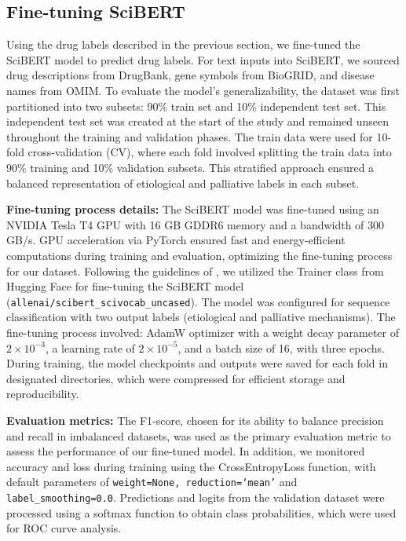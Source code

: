\documentclass[journal,twoside,web]{ieeecolor}
\begin{document}
\subsection{Fine-tuning SciBERT}
Using the drug labels described in the previous section, we fine-tuned the SciBERT model to predict drug labels.
For text inputs into SciBERT, we sourced drug descriptions from DrugBank, gene symbols from BioGRID, and disease names from OMIM. To evaluate the model’s generalizability, the dataset was first partitioned into two subsets:
90\% train set and 10\% independent test set.
This independent test set was created at the start of the study and remained unseen throughout the training and validation phases. 
The train data were used for 10-fold cross-validation (CV), where each fold involved splitting the train data into 90\% training and 10\% validation subsets. 
This stratified approach ensured a balanced representation of etiological and palliative labels in each subset.

\textbf{Fine-tuning process details:}
The SciBERT model was fine-tuned using an NVIDIA Tesla T4 GPU with 16 GB GDDR6 memory and a bandwidth of 300 GB/s. 
GPU acceleration via PyTorch ensured fast and energy-efficient computations during training and evaluation, optimizing the fine-tuning process for our dataset.
Following the guidelines of \cite{devlin-etal-2019-bert}, we utilized the Trainer class from Hugging Face \cite{wolf2019huggingface} for fine-tuning the SciBERT model (\texttt{allenai/scibert\_scivocab\_uncased}).
The model was configured for sequence classification with two output labels (etiological and palliative mechanisms).
The fine-tuning process involved:
AdamW optimizer with a weight decay parameter of $2 \times 10^{-3}$, a learning rate of $2 \times 10^{-5}$, and a batch size of 16, with three epochs.
During training, the model checkpoints and outputs were saved for each fold in designated directories, which were compressed for efficient storage and reproducibility.

\textbf{Evaluation metrics:}
The F1-score, chosen for its ability to balance precision and recall in imbalanced datasets, was used as the primary evaluation metric to assess the performance of our fine-tuned model.
In addition, we monitored accuracy and loss during training using the CrossEntropyLoss function, with default parameters of \texttt{weight=None, reduction=`mean'} and \texttt{label\_smoothing=0.0}.
Predictions and logits from the validation dataset were processed using a softmax function to obtain class probabilities, which were used for ROC curve analysis.
\end{document}
